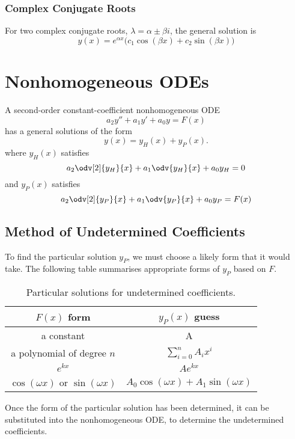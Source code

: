 \documentclass{article}
\begin{document}
\subsubsection{Complex Conjugate Roots}
For two complex conjugate roots, \(\lambda = \alpha \pm \beta i\), the general solution is
\begin{equation*}
    y(x) = e^{\alpha x}\bigl( c_1\cos{\left( \beta x \right)} + c_2 \sin{\left( \beta x \right)} \bigr)
\end{equation*}
\section{Nonhomogeneous ODEs}
A second-order constant-coefficient nonhomogeneous ODE
\begin{equation*}
    a_2y'' + a_1y' + a_0y = F(x)
\end{equation*}
has a general solutions of the form
\begin{equation*}
    y(x) = y_H(x) + y_P(x).
\end{equation*}
where \(y_H(x)\) satisfies
\begin{equation*}
    a_2\odv[2]{y_H}{x} + a_1\odv{y_H}{x} + a_0y_H = 0
\end{equation*}
and \(y_P(x)\) satisfies
\begin{equation*}
    a_2\odv[2]{y_P}{x} + a_1\odv{y_P}{x} + a_0y_P = F(x)
\end{equation*}
\subsection{Method of Undetermined Coefficients}
To find the particular solution \(y_P\), we must choose a likely
form that it would take. The following table summarises appropriate
forms of \(y_P\) based on \(F\).
\begin{table}[H]
    \centering
    \begin{tabular}{c c}
        \toprule
        \(F(x)\) form                                                          & \(y_P(x)\) guess                                                          \\
        \midrule
        a constant                                                             & A                                                                         \\
        a polynomial of degree \(n\)                                           & \(\displaystyle \sum_{i = 0}^n A_i x^i\)                                  \\
        \(e^{kx}\)                                                            & \(A e^{kx}\)                                                             \\
        \(\cos{\left( \omega x \right)}\) or \(\sin{\left( \omega x \right)}\) & \(A_0 \cos{\left( \omega x \right)} + A_1 \sin{\left( \omega x \right)}\) \\
        \bottomrule
    \end{tabular}
    \caption{Particular solutions for undetermined coefficients.}
\end{table}
Once the form of the particular solution has been determined, it can be substituted into the
nonhomogeneous ODE, to determine the undetermined coefficients.
\end{document}
